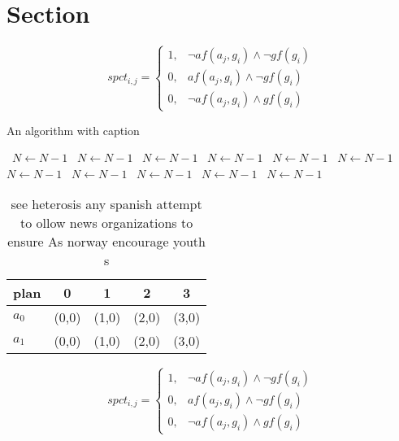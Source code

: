 \documentclass[a4paper]{article}
\begin{document}
\section{Section}

\begin{equation}
spct_{i,j} =
\begin{cases}
1, & \text{$\neg af(a_j,g_i) \wedge \neg gf(g_i)$}\\
0, & \text{$af(a_j,g_i) \wedge \neg gf(g_i)$}\\
0, & \text{$\neg af(a_j,g_i) \wedge gf(g_i)$}
\end{cases}
\end{equation}

\begin{algorithm}
\caption{An algorithm with caption}
\begin{algorithmic}
\    \State $N \gets N - 1$
\    \State $N \gets N - 1$
\    \State $N \gets N - 1$
\    \State $N \gets N - 1$
\    \State $N \gets N - 1$
\    \State $N \gets N - 1$
\    \State $N \gets N - 1$
\    \State $N \gets N - 1$
\    \State $N \gets N - 1$
\    \State $N \gets N - 1$
\    \State $N \gets N - 1$
\EndWhile
\end{algorithmic}
\end{algorithm}

\begin{table}
\begin{adjustbox}{width=0.6\columnwidth}
\begin{tabular}{|l|l|l|l|l|}
\hline
\textbf{plan} & \multicolumn{1}{c|}{\textbf{0}} & \multicolumn{1}{c|}{\textbf{1}} & \multicolumn{1}{c|}{\textbf{2}} & \multicolumn{1}{c|}{\textbf{3}} \\ \hline
\textbf{$a_0$}  & (0,0) & (1,0) & (2,0) & (3,0) \\ \hline
\textbf{$a_1$}  & (0,0) & (1,0) & (2,0) & (3,0) \\ \hline
\end{tabular}
\end{adjustbox}
\caption{see heterosis any spanish attempt to ollow news organizations to ensure As norway encourage youth s
}
\end{table}

\begin{equation}
spct_{i,j} =
\begin{cases}
1, & \text{$\neg af(a_j,g_i) \wedge \neg gf(g_i)$}\\
0, & \text{$af(a_j,g_i) \wedge \neg gf(g_i)$}\\
0, & \text{$\neg af(a_j,g_i) \wedge gf(g_i)$}
\end{cases}
\end{equation}
\end{document}
